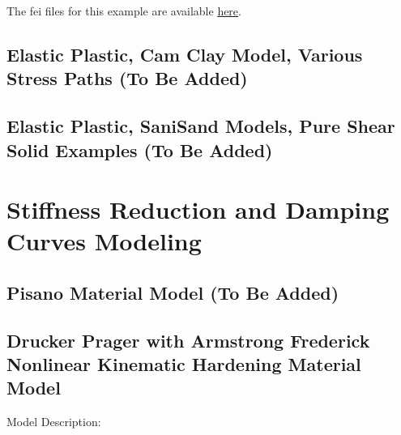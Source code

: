\documentclass[fleqn,11pt]{article}
\begin{document}
The fei files for this example are available \href{https://github.com/yuan-energy/education_examples/tree/master/fei_examples/Drucker_Prager_Associate_Flow_Solid/2pure_shear_cyclic_loading}{here}.




\newpage
\subsection{Elastic Plastic, Cam Clay Model, Various Stress Paths (To Be Added)}

\subsection{Elastic  Plastic, SaniSand Models, Pure Shear Solid Examples (To Be Added)}

\section{Stiffness Reduction and Damping Curves Modeling}

\subsection{Pisano Material Model (To Be Added)}


\newpage
\subsection{Drucker Prager with Armstrong Frederick
            Nonlinear Kinematic Hardening
            Material Model}



Model Description:
\end{document}

